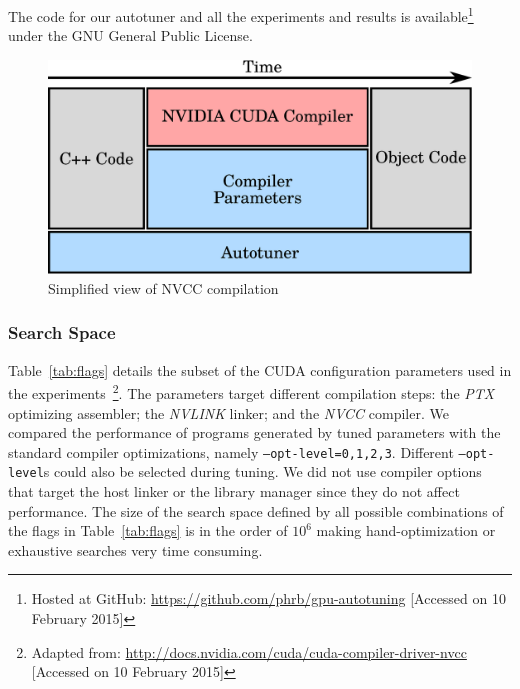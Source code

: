 The code for our autotuner and all the experiments and results is
available\footnote{Hosted at GitHub:
\url{https://github.com/phrb/gpu-autotuning} [Accessed on 10 February 2015]}
under the GNU General Public License.

\begin{figure}[htpb]
    \centering
    \includegraphics[width=.4\textwidth]{./images/gpu-stack}
    \caption{Simplified view of NVCC compilation}
    \label{fig:gpu-stack}
\end{figure}

\subsubsection{Search Space}

Table~\ref{tab:flags} details the subset of the CUDA configuration parameters
used in the experiments~\footnote{Adapted from:
\url{http://docs.nvidia.com/cuda/cuda-compiler-driver-nvcc} [Accessed on 10
February 2015]}.  The parameters target different compilation steps: the
\emph{PTX} optimizing assembler; the \emph{NVLINK} linker; and the \emph{NVCC}
compiler.  We compared the performance of programs generated by tuned
parameters with the standard compiler optimizations, namely
\texttt{--opt-level=0,1,2,3}.  Different \texttt{--opt-level}s could also be
selected during tuning.  We did not use compiler options that target the host
linker or the library manager since they do not affect performance.  The size
of the search space defined by all possible combinations of the flags in
Table~\ref{tab:flags} is in the order of $10^{6}$ making hand-optimization or
exhaustive searches very time consuming.


